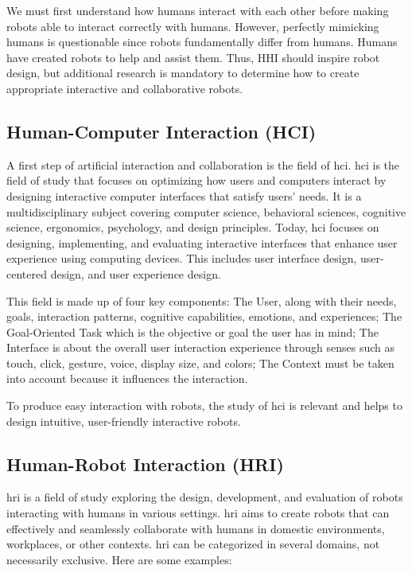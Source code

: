 We must first understand how humans interact with each other before making robots able to interact correctly with humans. However, perfectly mimicking humans is questionable since robots fundamentally differ from humans. Humans have created robots to help and assist them. Thus, HHI should inspire robot design, but additional research is mandatory to determine how to create appropriate interactive and collaborative robots.

\subsection{Human-Computer Interaction (HCI)}

A first step of artificial interaction and collaboration is the field of \acrfull{hci}. \acrshort{hci} is the field of study that focuses on optimizing how users and computers interact by designing interactive computer interfaces that satisfy users' needs. It is a multidisciplinary subject covering computer science, behavioral sciences, cognitive science, ergonomics, psychology, and design principles.
Today, \acrshort{hci} focuses on designing, implementing, and evaluating interactive interfaces that enhance user experience using computing devices. This includes user interface design, user-centered design, and user experience design. 

This field is made up of four key components: 
The User, along with their needs, goals, interaction patterns, cognitive capabilities, emotions, and experiences; 
The Goal-Oriented Task which is the objective or goal the user has in mind; 
The Interface is about the overall user interaction experience through senses such as touch, click, gesture, voice, display size, and colors;
The Context must be taken into account because it influences the interaction. 

To produce easy interaction with robots, the study of \acrshort{hci} is relevant and helps to design intuitive, user-friendly interactive robots.

\subsection{Human-Robot Interaction (HRI)}

\acrfull{hri} is a field of study exploring the design, development, and evaluation of robots interacting with humans in various settings. \acrshort{hri} aims to create robots that can effectively and seamlessly collaborate with humans in domestic environments, workplaces, or other contexts. 
\acrshort{hri} can be categorized in several domains, not necessarily exclusive. Here are some examples:

